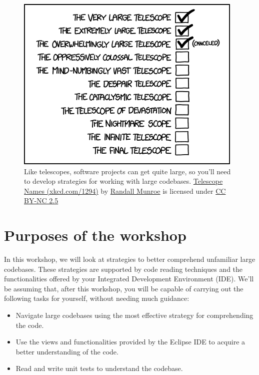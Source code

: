 \documentclass[
]{book}
\providecommand{\tightlist}{%
  \setlength{\itemsep}{0pt}\setlength{\parskip}{0pt}}
\begin{document}
\begin{figure}

{\centering \includegraphics[width=0.75\linewidth]{images/telescope_names} 

}

\caption{Like telescopes, software projects can get quite large, so you'll need to develop strategies for working with large codebases. \href{https://xkcd.com/1294/}{Telescope Names (xkcd.com/1294)} by \href{https://en.wikipedia.org/wiki/Randall_Munroe}{Randall Munroe} is licensed under \href{https://creativecommons.org/licenses/by-nc/2.5/}{CC BY-NC 2.5}}\label{fig:xkcd-large-fig}
\end{figure}



\hypertarget{purposes}{%
\section{Purposes of the workshop}\label{purposes}}

In this workshop, we will look at strategies to better comprehend unfamiliar large codebases. These strategies are supported by code reading techniques \citep{codereading} and the functionalities offered by your Integrated Development Environment (IDE). We'll be assuming that, after this workshop, you will be capable of carrying out the following tasks for yourself, without needing much guidance:

\begin{itemize}
\tightlist
\item
  Navigate large codebases using the most effective strategy for comprehending the code.
\item
  Use the views and functionalities provided by the Eclipse IDE to acquire a better understanding of the code.\\
\item
  Read and write unit tests to understand the codebase.
\end{itemize}
\end{document}
